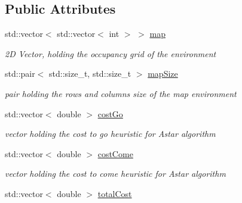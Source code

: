 \subsection*{Public Attributes}
\begin{DoxyCompactItemize}
\item 
std\+::vector$<$ std\+::vector$<$ int $>$ $>$ \hyperlink{classPathPlanner_a8a53e6344c45f2de3f0172790f97bfb5}{map}\hypertarget{classPathPlanner_a8a53e6344c45f2de3f0172790f97bfb5}{}\label{classPathPlanner_a8a53e6344c45f2de3f0172790f97bfb5}

\begin{DoxyCompactList}\small\item\em 2D Vector, holding the occupancy grid of the environment \end{DoxyCompactList}\item 
std\+::pair$<$ std\+::size\+\_\+t, std\+::size\+\_\+t $>$ \hyperlink{classPathPlanner_a3879a2e588346eac8c102492b5f7e83f}{map\+Size}\hypertarget{classPathPlanner_a3879a2e588346eac8c102492b5f7e83f}{}\label{classPathPlanner_a3879a2e588346eac8c102492b5f7e83f}

\begin{DoxyCompactList}\small\item\em pair holding the rows and columns size of the map environment \end{DoxyCompactList}\item 
std\+::vector$<$ double $>$ \hyperlink{classPathPlanner_af81e5aae0bbe71bb0483943e3051f90b}{cost\+Go}\hypertarget{classPathPlanner_af81e5aae0bbe71bb0483943e3051f90b}{}\label{classPathPlanner_af81e5aae0bbe71bb0483943e3051f90b}

\begin{DoxyCompactList}\small\item\em vector holding the cost to go heuristic for Astar algorithm \end{DoxyCompactList}\item 
std\+::vector$<$ double $>$ \hyperlink{classPathPlanner_aeb2506ae7a5fff04ad938d6a1da8e4b2}{cost\+Come}\hypertarget{classPathPlanner_aeb2506ae7a5fff04ad938d6a1da8e4b2}{}\label{classPathPlanner_aeb2506ae7a5fff04ad938d6a1da8e4b2}

\begin{DoxyCompactList}\small\item\em vector holding the cost to come heuristic for Astar algorithm \end{DoxyCompactList}\item 
std\+::vector$<$ double $>$ \hyperlink{classPathPlanner_a4e3603445e01a2bf866d459522aba5e5}{total\+Cost}\hypertarget{classPathPlanner_a4e3603445e01a2bf866d459522aba5e5}{}\label{classPathPlanner_a4e3603445e01a2bf866d459522aba5e5}


\end{DoxyCompactItemize}
